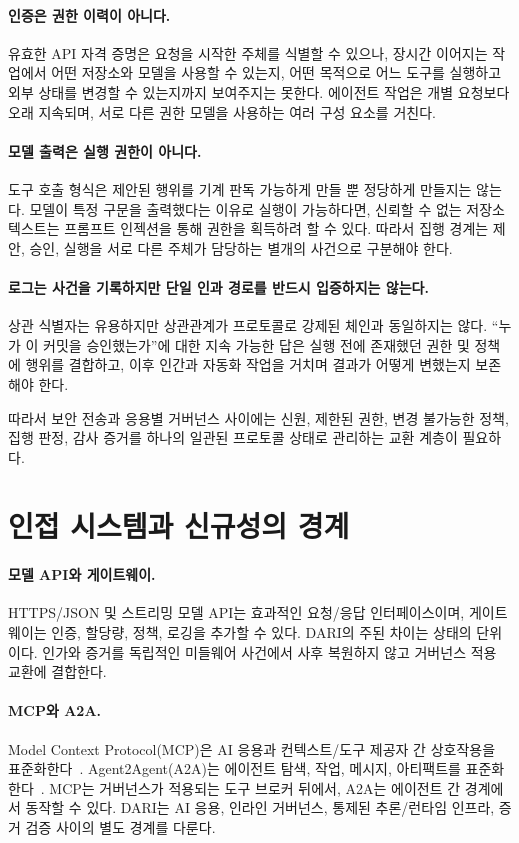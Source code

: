 \documentclass[10pt]{article}
\newcommand{\dariname}{DARI}
\begin{document}
\paragraph{인증은 권한 이력이 아니다.}
유효한 API 자격 증명은 요청을 시작한 주체를 식별할 수 있으나, 장시간 이어지는 작업에서 어떤 저장소와 모델을 사용할 수 있는지, 어떤 목적으로 어느 도구를 실행하고 외부 상태를 변경할 수 있는지까지 보여주지는 못한다. 에이전트 작업은 개별 요청보다 오래 지속되며, 서로 다른 권한 모델을 사용하는 여러 구성 요소를 거친다.

\paragraph{모델 출력은 실행 권한이 아니다.}
도구 호출 형식은 제안된 행위를 기계 판독 가능하게 만들 뿐 정당하게 만들지는 않는다. 모델이 특정 구문을 출력했다는 이유로 실행이 가능하다면, 신뢰할 수 없는 저장소 텍스트는 프롬프트 인젝션을 통해 권한을 획득하려 할 수 있다. 따라서 집행 경계는 제안, 승인, 실행을 서로 다른 주체가 담당하는 별개의 사건으로 구분해야 한다.

\paragraph{로그는 사건을 기록하지만 단일 인과 경로를 반드시 입증하지는 않는다.}
상관 식별자는 유용하지만 상관관계가 프로토콜로 강제된 체인과 동일하지는 않다. ``누가 이 커밋을 승인했는가''에 대한 지속 가능한 답은 실행 전에 존재했던 권한 및 정책에 행위를 결합하고, 이후 인간과 자동화 작업을 거치며 결과가 어떻게 변했는지 보존해야 한다.

따라서 보안 전송과 응용별 거버넌스 사이에는 신원, 제한된 권한, 변경 불가능한 정책, 집행 판정, 감사 증거를 하나의 일관된 프로토콜 상태로 관리하는 교환 계층이 필요하다.

\section{인접 시스템과 신규성의 경계}

\paragraph{모델 API와 게이트웨이.}
HTTPS/JSON 및 스트리밍 모델 API는 효과적인 요청/응답 인터페이스이며, 게이트웨이는 인증, 할당량, 정책, 로깅을 추가할 수 있다. \dariname{}의 주된 차이는 상태의 단위이다. 인가와 증거를 독립적인 미들웨어 사건에서 사후 복원하지 않고 거버넌스 적용 교환에 결합한다.

\paragraph{MCP와 A2A.}
Model Context Protocol(MCP)은 AI 응용과 컨텍스트/도구 제공자 간 상호작용을 표준화한다~\cite{mcp2025}. Agent2Agent(A2A)는 에이전트 탐색, 작업, 메시지, 아티팩트를 표준화한다~\cite{a2a2026}. MCP는 거버넌스가 적용되는 도구 브로커 뒤에서, A2A는 에이전트 간 경계에서 동작할 수 있다. \dariname{}는 AI 응용, 인라인 거버넌스, 통제된 추론/런타임 인프라, 증거 검증 사이의 별도 경계를 다룬다.
\end{document}
